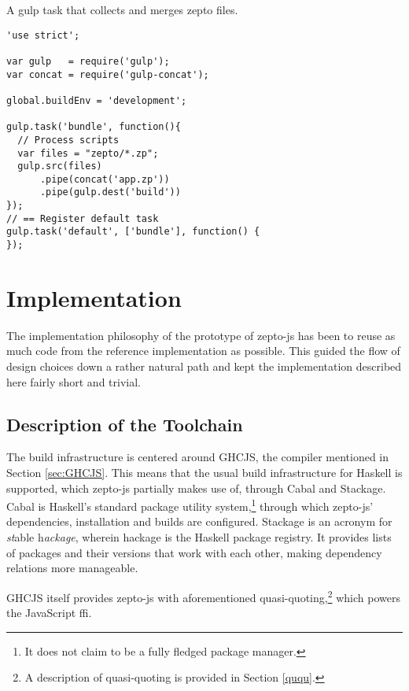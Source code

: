 \documentclass[oneside,11pt,xetex]{scrbook}
\begin{document}
\begin{listing}[H]
\caption{A gulp task that collects and merges zepto files.}
\begin{verbatim}
'use strict';

var gulp   = require('gulp');
var concat = require('gulp-concat');

global.buildEnv = 'development';

gulp.task('bundle', function(){
  // Process scripts
  var files = "zepto/*.zp";
  gulp.src(files)
      .pipe(concat('app.zp'))
      .pipe(gulp.dest('build'))
});
// == Register default task
gulp.task('default', ['bundle'], function() {
});
\end{verbatim}
\label{fig:gulp}
\end{listing}

\chapter{Implementation}
\label{chap:Implementation}

The implementation philosophy of the prototype of zepto-js has been to reuse as much
code from the reference implementation as possible. This guided the flow of design choices
down a rather natural path and kept the implementation described here fairly short and trivial.

\section{Description of the Toolchain}

The build infrastructure is centered around GHCJS, the compiler mentioned in Section \ref{sec:GHCJS}.
This means that the usual build infrastructure for Haskell is supported, which zepto-js partially
makes use of, through Cabal and Stackage. Cabal is Haskell's standard package utility
system,\footnote{It does not claim to be a fully fledged package manager.} through which
zepto-js' dependencies, installation and builds are configured. Stackage is an acronym
for \textit{st}able h\textit{ackage}, wherein hackage is the Haskell package registry.
It provides lists of packages and their versions that work with each other, making
dependency relations more manageable.

GHCJS itself provides zepto-js with aforementioned quasi-quoting,\footnote{A description
of quasi-quoting is provided in Section \ref{ququ}.} which powers the JavaScript \gls{ffi}.
\end{document}
